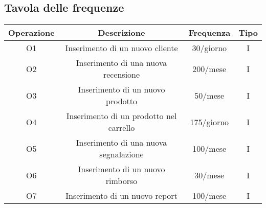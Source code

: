\subsection{Tavola delle frequenze}
\begin{center}
\begin{tabular}{ |c|c|c|c|} 
\hline
Operazione & Descrizione & Frequenza & Tipo \\
\hline
\multirow{3}{6em}{O1} & \multirow{3}{8em}{Inserimento di un nuovo cliente} & \multirow{3}{12em}{30/giorno} & \multirow{3}{12em}{I}\\
 & & &\\
 & & &\\
\hline

\multirow{3}{6em}{O2} & \multirow{3}{8em}{Inserimento di una nuova recensione} & \multirow{3}{12em}{200/mese} & \multirow{3}{12em}{I}\\
 & & &\\
 & & &\\
 \hline

\multirow{3}{6em}{O3} & \multirow{3}{8em}{Inserimento di un nuovo prodotto} & \multirow{3}{12em}{50/mese} & \multirow{3}{12em}{I}\\
 & & &\\
 & & &\\
\hline

\multirow{3}{6em}{O4} & \multirow{3}{8em}{Inserimento di un prodotto nel carrello} & \multirow{3}{12em}{175/giorno} & \multirow{3}{12em}{I}\\
 & & &\\
 & & &\\
\hline

\multirow{3}{6em}{O5} & \multirow{3}{8em}{Inserimento di una nuova segnalazione} & \multirow{3}{12em}{100/mese} & \multirow{3}{12em}{I}\\
 & & &\\
 & & &\\
\hline

\multirow{3}{6em}{O6} & \multirow{3}{8em}{Inserimento di un nuovo rimborso} & \multirow{3}{12em}{30/mese} & \multirow{3}{12em}{I}\\
 & & &\\
 & & &\\
\hline

\multirow{3}{6em}{O7} & \multirow{3}{8em}{Inserimento di un nuovo report} & \multirow{3}{12em}{100/mese} & \multirow{3}{12em}{I}\\
 & & &\\
 & & &\\
\hline


\end{tabular}
\end{center}
